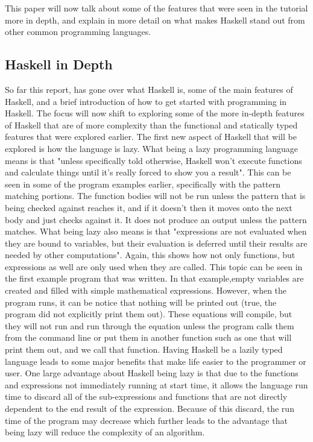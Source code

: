 \documentclass{article}
\begin{document}
This paper will now talk about some of the features that were seen in the tutorial more in depth, and explain in more detail on what makes Haskell stand out from other common programming languages.
\medskip\noindent
\subsection{Haskell in Depth}
So far this report, has gone over what Haskell is, some of the main features of Haskell, and a brief introduction of how to get started with programming in Haskell.
The focus will now shift to exploring some of the more in-depth features of Haskell that are of more complexity than the functional and statically typed features that were explored earlier.
The first new aspect of Haskell that will be explored is how the language is lazy.
What being a lazy programming language means is that "unless specifically told otherwise, Haskell won't execute functions and calculate things until it's really forced to show you a result".
This can be seen in some of the program examples earlier, specifically with the pattern matching portions.
The function bodies will not be run unless the pattern that is being checked against reaches it, and if it doesn't then it moves onto the next body and just checks against it.
It does not produce an output unless the pattern matches.
What being lazy also means is that "expressions are not evaluated when they are bound to variables, but their evaluation is deferred until their results are needed by other computations".
Again, this shows how not only functions, but expressions as well are only used when they are called.
This topic can be seen in the first example program that was written.
In that example,empty variables are created and filled with simple mathematical expressions.
However, when the program runs, it can be notice that nothing will be printed out (true, the program did not explicitly print them out).
These equations will compile, but they will not run and run through the equation unless the program calls them from the command line or put them in another function such as one that will print them out, and we call that function.
Having Haskell be a lazily typed language leads to some major benefits that make life easier to the programmer or user.
One large advantage about Haskell being lazy is that due to the functions and expressions not immediately running at start time, it allows the language run time to discard all of the sub-expressions and functions that are not directly dependent to the end result of the expression.
Because of this discard, the run time of the program may decrease which further leads to the advantage that being lazy will reduce the complexity of an algorithm.
\end{document}
